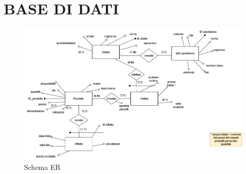 \section{BASE DI DATI}
\begin{figure}[H]
        \centering
        \includegraphics[width=1.0\textwidth]{immagini/Schema_ER_progetto_tsw(1).drawio(1).png}
        \caption{Schema ER}
    \end{figure}